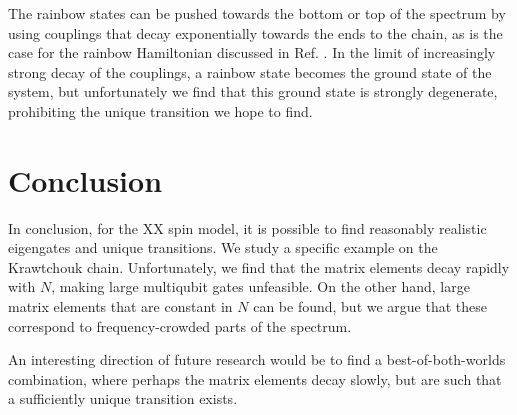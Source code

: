 The rainbow states can be pushed towards the bottom or top of the spectrum by using couplings that decay exponentially towards the ends to the chain, as is the case for the rainbow Hamiltonian discussed in Ref. \cite{Ramirez2018}. In the limit of increasingly strong decay of the couplings, a rainbow state becomes the ground state of the system, but unfortunately we find that this ground state is strongly degenerate, prohibiting the unique transition we hope to find. 

\section{Conclusion}
In conclusion, for the XX spin model, it is possible to find reasonably realistic eigengates and unique transitions. We study a specific example on the Krawtchouk chain. Unfortunately, we find that the matrix elements decay rapidly with $N$, making large multiqubit gates unfeasible. On the other hand, large matrix elements that are constant in $N$ can be found, but we argue that these correspond to frequency-crowded parts of the spectrum. 

An interesting direction of future research would be to find a best-of-both-worlds combination, where perhaps the matrix elements decay slowly, but are such that a sufficiently unique transition exists. 



